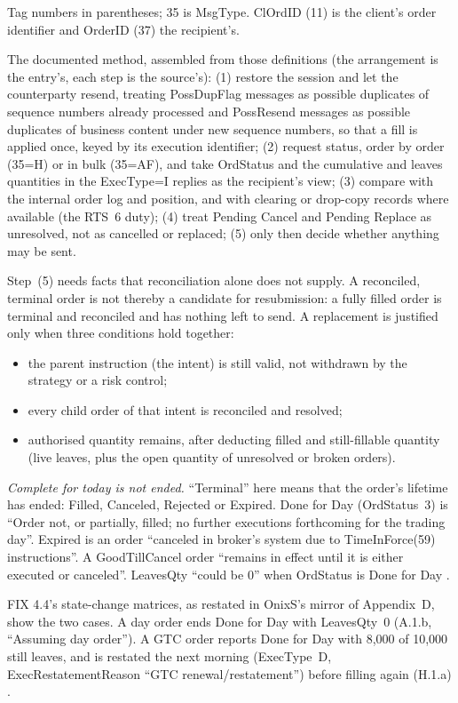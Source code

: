 \begin{qfmechanism}
 Tag numbers in parentheses; 35 is MsgType. ClOrdID (11) is the client's order identifier and OrderID (37) the recipient's.

 The documented method, assembled from those definitions (the arrangement is the entry's, each step is the source's): (1) restore the session and let the counterparty resend, treating PossDupFlag messages as possible duplicates of sequence numbers already processed and PossResend messages as possible duplicates of business content under new sequence numbers, so that a fill is applied once, keyed by its execution identifier; (2) request status, order by order (35=H) or in bulk (35=AF), and take OrdStatus and the cumulative and leaves quantities in the ExecType=I replies as the recipient's view; (3) compare with the internal order log and position, and with clearing or drop-copy records where available (the RTS~6 duty); (4) treat Pending Cancel and Pending Replace as unresolved, not as cancelled or replaced; (5) only then decide whether anything may be sent.

Step~(5) needs facts that reconciliation alone does not supply. A reconciled, terminal order is not thereby a candidate for resubmission: a fully filled order is terminal and reconciled and has nothing left to send. A replacement is justified only when three conditions hold together:
\begin{itemize}
\item the parent instruction (the intent) is still valid, not withdrawn by the strategy or a risk control;
\item every child order of that intent is reconciled and resolved;
\item authorised quantity remains, after deducting filled and still-fillable quantity (live leaves, plus the open quantity of unresolved or broken orders).
\end{itemize}
\emph{Complete for today is not ended.} ``Terminal'' here means that the order's lifetime has ended: Filled, Canceled, Rejected or Expired. Done for Day (OrdStatus~3) is ``Order not, or partially, filled; no further executions forthcoming for the trading day''. Expired is an order ``canceled in broker's system due to TimeInForce(59) instructions''. A GoodTillCancel order ``remains in effect until it is either executed or canceled''. LeavesQty ``could be 0'' when OrdStatus is Done for Day \citep[FIX Latest, EP312, OrdStatus precedence table, codes 59 and field 151]{s6-fix}.

FIX 4.4's state-change matrices, as restated in OnixS's mirror of Appendix~D, show the two cases. A day order ends Done for Day with LeavesQty~0 (A.1.b, ``Assuming day order''). A GTC order reports Done for Day with 8{,}000 of 10{,}000 still leaves, and is restated the next morning (ExecType~D, ExecRestatementReason ``GTC renewal/restatement'') before filling again (H.1.a) \citep[app.~D, matrices A.1.b and H.1.a]{onixs-fix44-appd}.


\end{qfmechanism}
